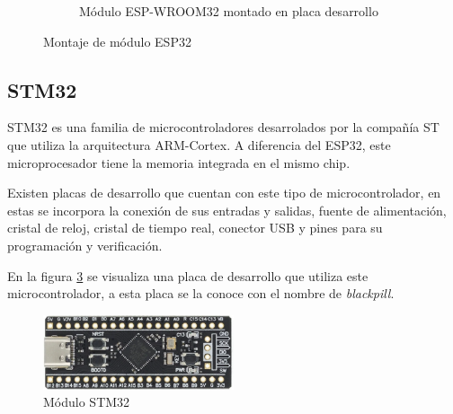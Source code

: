 \begin{figure}[h!]
\begin{subfigure}[b]{0.3\linewidth}
	\caption{Módulo ESP-WROOM32 montado en placa desarrollo}
	\label{fig:ESP2}
\end{subfigure}
\caption{Montaje de módulo ESP32}
\label{fig:ESP32}
\end{figure}

\subsection{STM32}
STM32 es una familia de microcontroladores desarrolados por la compañía ST que utiliza la arquitectura ARM-Cortex. A diferencia del ESP32, este microprocesador tiene la memoria integrada en el mismo chip\citep{stm}.

Existen placas de desarrollo que cuentan con este tipo de microcontrolador, en estas se incorpora la conexión de sus entradas y salidas, fuente de alimentación, cristal de reloj, cristal de tiempo real, conector USB y pines para su programación y verificación. 

En la figura \ref{fig:bpill} se visualiza una placa de desarrollo que utiliza este microcontrolador, a esta placa se la conoce con el nombre de \textit{blackpill}.
\begin{figure}[htbp]
	\centering
	\includegraphics[width=0.5\textwidth]{./Figures/bpill.png}
	\caption{Módulo STM32}
	\label{fig:bpill}
\end{figure} 

